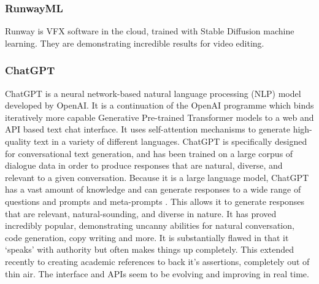 \begin{comment}
-Text-to-Image
DALL-E2
Stable diffusion
Muse
Imagen
-Text-to-3D
dreamfusion
magic3d
-image-to-text
Flamingo
VisualGPT
-Text-to-video
Phenaki
Soundify
-Text-to-code
Codex
Alphacode
-Text-to-Audio
AudioLM
Whisper
Jukebox
-Text-To-Text
ChatGPT3
PEER
LaMDA
Speech From Brain
-Text-to-science
Galactica
Minerva
-Other models
Alphatensor
GATO
Human motion diffusion model
\end{comment}

\subsubsection{RunwayML}
Runway is VFX software in the cloud, trained with Stable Diffusion machine learning. They are demonstrating incredible results for video editing.
\subsubsection{ChatGPT}
ChatGPT is a neural network-based natural language processing (NLP) model developed by OpenAI. It is a continuation of the OpenAI programme which binds iteratively more capable Generative Pre-trained Transformer models to a web and API based text chat interface. It uses self-attention mechanisms to generate high-quality text in a variety of different languages. ChatGPT is specifically designed for conversational text generation, and has been trained on a large corpus of dialogue data in order to produce responses that are natural, diverse, and relevant to a given conversation. Because it is a large language model, ChatGPT has a vast amount of knowledge and can generate responses to a wide range of questions and prompts and meta-prompts \cite{hou2022metaprompting}. This allows it to generate responses that are relevant, natural-sounding, and diverse in nature. It has proved incredibly popular, demonstrating uncanny abilities for natural conversation, code generation, copy writing and more. It is substantially flawed in that it `speaks' with authority but often makes things up completely. This extended recently to creating academic references to back it's assertions, completely out of thin air. The interface and APIs seem to be evolving and improving in real time.\par
